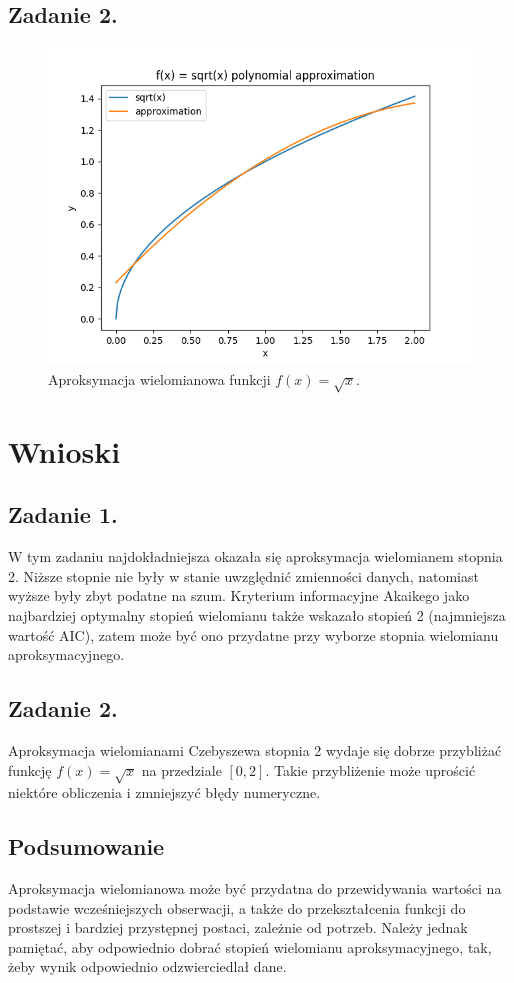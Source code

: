 \documentclass[11pt]{scrartcl}
\begin{document}
    \subsection{Zadanie 2.}
    \begin{figure}[H]
        \centering
        \includegraphics[width=0.8\linewidth]{approx2.png}
        \caption{Aproksymacja wielomianowa funkcji $f(x)=\sqrt{x}$.}
    \end{figure}

    \section{Wnioski}
    \subsection*{Zadanie 1.}
    W tym zadaniu najdokładniejsza okazała się aproksymacja wielomianem
    stopnia 2. Niższe stopnie nie były w stanie uwzględnić zmienności
    danych, natomiast wyższe były zbyt podatne na szum. Kryterium
    informacyjne Akaikego jako najbardziej optymalny stopień wielomianu
    także wskazało stopień 2 (najmniejsza wartość AIC), zatem może być ono
    przydatne przy wyborze stopnia wielomianu aproksymacyjnego.

    \subsection*{Zadanie 2.}
    Aproksymacja wielomianami Czebyszewa stopnia 2 wydaje się dobrze
    przybliżać funkcję $f(x)=\sqrt{x}$ na przedziale $[0,2]$. Takie
    przybliżenie może uprościć niektóre obliczenia i zmniejszyć błędy
    numeryczne.

    \subsection*{Podsumowanie}
    Aproksymacja wielomianowa może być przydatna do przewidywania wartości
    na podstawie wcześniejszych obserwacji, a także do przekształcenia
    funkcji do prostszej i bardziej przystępnej postaci, zależnie od potrzeb.
    Należy jednak pamiętać, aby odpowiednio dobrać stopień wielomianu
    aproksymacyjnego, tak, żeby wynik odpowiednio odzwierciedlał dane.
\end{document}
